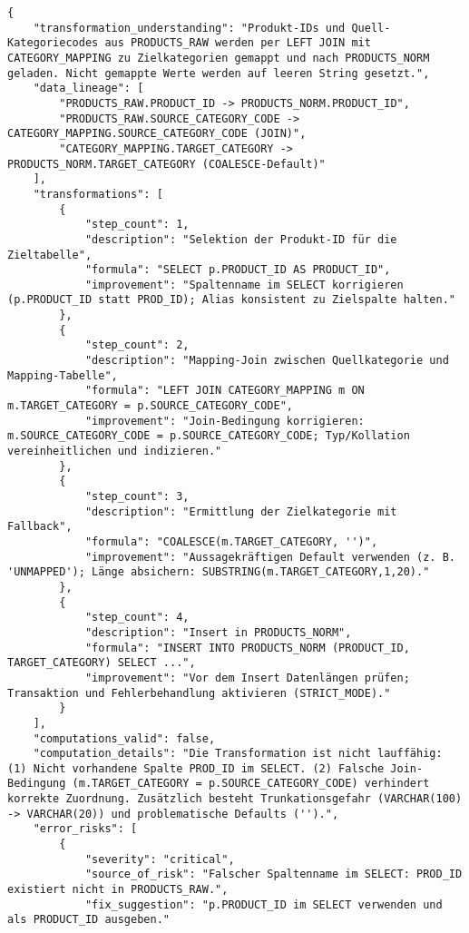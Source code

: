 \begin{lstlisting}[caption={Ausgabe: GPT-5 Anwendungsfall 6 Hauptdurchlauf},label={gpt_case6_prompt1}]
{
    "transformation_understanding": "Produkt-IDs und Quell-Kategoriecodes aus PRODUCTS_RAW werden per LEFT JOIN mit CATEGORY_MAPPING zu Zielkategorien gemappt und nach PRODUCTS_NORM geladen. Nicht gemappte Werte werden auf leeren String gesetzt.",
    "data_lineage": [
        "PRODUCTS_RAW.PRODUCT_ID -> PRODUCTS_NORM.PRODUCT_ID",
        "PRODUCTS_RAW.SOURCE_CATEGORY_CODE -> CATEGORY_MAPPING.SOURCE_CATEGORY_CODE (JOIN)",
        "CATEGORY_MAPPING.TARGET_CATEGORY -> PRODUCTS_NORM.TARGET_CATEGORY (COALESCE-Default)"
    ],
    "transformations": [
        {
            "step_count": 1,
            "description": "Selektion der Produkt-ID für die Zieltabelle",
            "formula": "SELECT p.PRODUCT_ID AS PRODUCT_ID",
            "improvement": "Spaltenname im SELECT korrigieren (p.PRODUCT_ID statt PROD_ID); Alias konsistent zu Zielspalte halten."
        },
        {
            "step_count": 2,
            "description": "Mapping-Join zwischen Quellkategorie und Mapping-Tabelle",
            "formula": "LEFT JOIN CATEGORY_MAPPING m ON m.TARGET_CATEGORY = p.SOURCE_CATEGORY_CODE",
            "improvement": "Join-Bedingung korrigieren: m.SOURCE_CATEGORY_CODE = p.SOURCE_CATEGORY_CODE; Typ/Kollation vereinheitlichen und indizieren."
        },
        {
            "step_count": 3,
            "description": "Ermittlung der Zielkategorie mit Fallback",
            "formula": "COALESCE(m.TARGET_CATEGORY, '')",
            "improvement": "Aussagekräftigen Default verwenden (z. B. 'UNMAPPED'); Länge absichern: SUBSTRING(m.TARGET_CATEGORY,1,20)."
        },
        {
            "step_count": 4,
            "description": "Insert in PRODUCTS_NORM",
            "formula": "INSERT INTO PRODUCTS_NORM (PRODUCT_ID, TARGET_CATEGORY) SELECT ...",
            "improvement": "Vor dem Insert Datenlängen prüfen; Transaktion und Fehlerbehandlung aktivieren (STRICT_MODE)."
        }
    ],
    "computations_valid": false,
    "computation_details": "Die Transformation ist nicht lauffähig: (1) Nicht vorhandene Spalte PROD_ID im SELECT. (2) Falsche Join-Bedingung (m.TARGET_CATEGORY = p.SOURCE_CATEGORY_CODE) verhindert korrekte Zuordnung. Zusätzlich besteht Trunkationsgefahr (VARCHAR(100) -> VARCHAR(20)) und problematische Defaults ('').",
    "error_risks": [
        {
            "severity": "critical",
            "source_of_risk": "Falscher Spaltenname im SELECT: PROD_ID existiert nicht in PRODUCTS_RAW.",
            "fix_suggestion": "p.PRODUCT_ID im SELECT verwenden und als PRODUCT_ID ausgeben."

\end{lstlisting}
